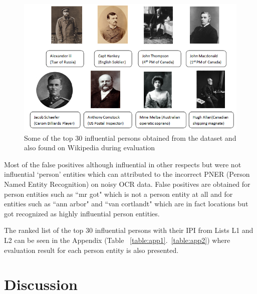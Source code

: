 \documentclass[10pt,journal,compsoc]{IEEEtran}
\begin{document}
\begin{figure}
\begin{center}
\includegraphics[scale=0.79]{ip}
\caption{Some of the top 30 influential persons obtained from the dataset and also found on Wikipedia during evaluation}
\label{figure:inf}
\end{center}
\end{figure}


 Most of the false positives although influential in other respects but were not  influential `person' entities which can attributed to the incorrect PNER (Person Named Entity Recognition) on noisy OCR data.
 False positives are obtained for person entities  such as ``mr got" which is not a person entity at all and for entities such as ``ann arbor" and ``van cortlandt" which are in fact locations but got recognized as highly influential person entities.
 
 The ranked list of the top 30 influential persons with their IPI from Lists L1 and L2 can be seen in the Appendix (Table ~\ref{table:app1}.~\ref{table:app2}) where evaluation result for each person entity is also presented.


\section{Discussion}
\label{influential:discussion}
\end{document}
